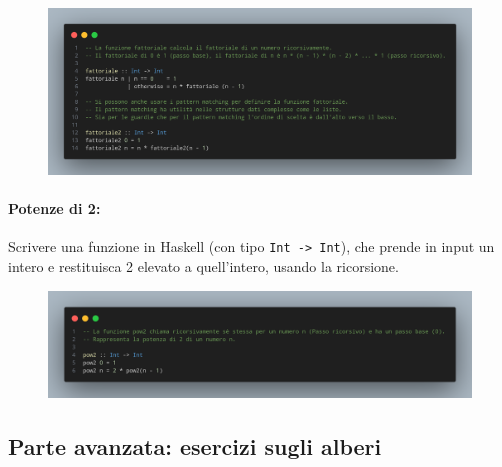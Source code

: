 \begin{figure}[!h]
    \centering
    \includegraphics[width=1\textwidth]{images/Fattoriale2.png}
\end{figure}

\paragraph{Potenze di 2:} Scrivere una funzione in Haskell (con tipo \texttt{Int -> Int}),
che prende in input un intero e restituisca 2 elevato a quell'intero, usando la ricorsione.

\begin{figure}[!h]
    \centering
    \includegraphics[width=1\textwidth]{images/Pow2.png}
\end{figure}

\pagebreak

\subsection{Parte avanzata: esercizi sugli alberi}